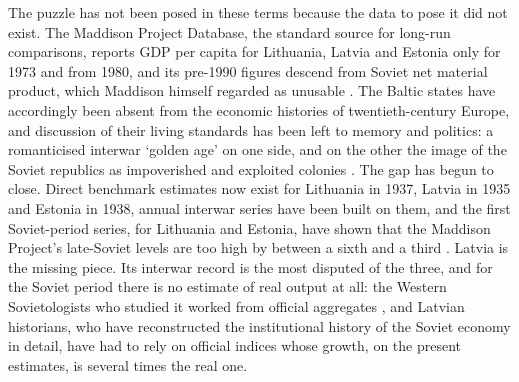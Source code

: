 The puzzle has not been posed in these terms because the data to pose it did not exist. The Maddison Project Database, the standard source for long-run comparisons, reports GDP per capita for Lithuania, Latvia and Estonia only for 1973 and from 1980, and its pre-1990 figures descend from Soviet net material product, which Maddison himself regarded as unusable \parencites[307--8]{Maddison1998b}{mpd2023}. The Baltic states have accordingly been absent from the economic histories of twentieth-century Europe, and discussion of their living standards has been left to memory and politics: a romanticised interwar `golden age' on one side, and on the other the image of the Soviet republics as impoverished and exploited colonies \parencites[92]{lehti_new_lvee}[98]{koll_2025_reinterpretation}. The gap has begun to close. Direct benchmark estimates now exist for Lithuania in 1937, Latvia in 1935 and Estonia in 1938, annual interwar series have been built on them, and the first Soviet-period series, for Lithuania and Estonia, have shown that the Maddison Project's late-Soviet levels are too high by between a sixth and a third \parencite{klimantas2019,norkuslatvia1935,Klimantas2024,klimantas2026soviet,klimantas2025estonia}. Latvia is the missing piece. Its interwar record is the most disputed of the three, and for the Soviet period there is no estimate of real output at all: the Western Sovietologists who studied it worked from official aggregates \parencite{king_1965_economic,viksnins_1981_evaluating}, and Latvian historians, who have reconstructed the institutional history of the Soviet economy in detail, have had to rely on official indices \parencite[277--8]{gatis_lv_eh} whose growth, on the present estimates, is several times the real one.


